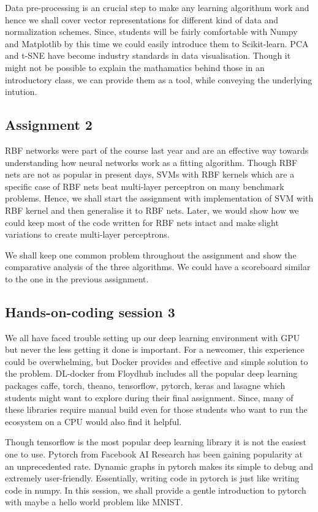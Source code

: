 \documentclass{article} %
\begin{document}
Data pre-processing is an crucial step to make any learning algorithum work
and hence we shall cover vector representations for different kind of data
and normalization schemes. Since, students will be fairly comfortable
with Numpy and Matplotlib by this time we could easily introduce them
to Scikit-learn. PCA and t-SNE have become industry standards in
data visualisation. Though it might not be possible to explain
the mathamatics behind those in an introductory class, we can
provide them as a tool, while conveying the underlying intution.

\subsection{Assignment 2}

RBF networks were part of the course last year and are an effective
way towards understanding how neural networks work as a fitting algorithm.
Though RBF nets are not as popular in present days, SVMs with RBF
kernels which are a specific case of RBF nets beat multi-layer perceptron
on many benchmark problems.
Hence, we shall start the assignment with implementation of SVM with
RBF kernel and then generalise it to RBF nets. Later, we would show how we
could keep most of the code written for RBF nets
intact and make slight variations to create multi-layer perceptrons.

We shall keep one common problem throughout the assignment and
show the comparative analysis of the three algorithms.
We could have a scoreboard similar to the one in the previous assignment.

\subsection{Hands-on-coding session 3}

We all have faced trouble setting up our deep learning environment
with GPU but never the less getting it done is important.
For a newcomer, this experience could be overwhelming, but Docker
provides and effective and simple solution to the problem. DL-docker
from Floydhub includes all the popular deep learning packages
caffe, torch, theano, tensorflow, pytorch, keras and lasagne which
students might want to explore during their final assignment.
Since, many of these libraries require manual build even for those
students who want to run the ecosystem on a CPU would
also find it helpful.


Though tensorflow is the most popular deep learning library
it is not the easiest one to use. Pytorch from Facebook
AI Research has been gaining popularity at an unprecedented rate.
Dynamic graphs in pytorch makes its simple to debug and extremely
user-friendly. Essentially, writing code in pytorch is just like
writing code in numpy. In this session, we shall provide a gentle
introduction to pytorch with maybe a hello world problem like MNIST.
\end{document}

